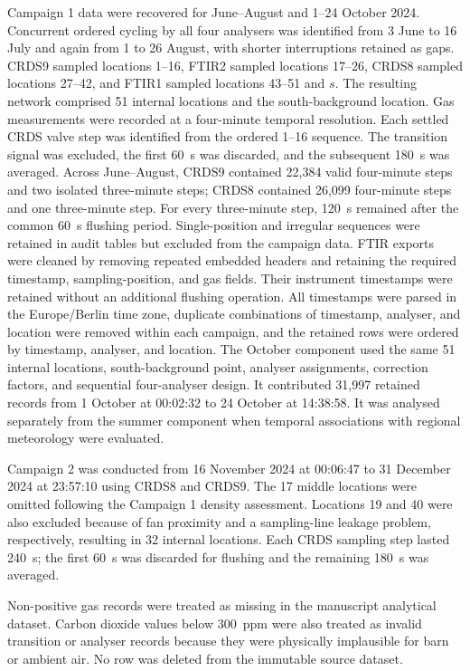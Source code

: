 \documentclass[12pt,a4paper]{article}
\begin{document}
Campaign 1 data were recovered for June--August and 1--24 October 2024.
Concurrent ordered
cycling by all four analysers was identified from 3 June to 16 July and again
from 1 to 26 August, with shorter interruptions retained as gaps. CRDS9
sampled locations 1--16, FTIR2 sampled locations 17--26,
CRDS8 sampled locations 27--42, and FTIR1 sampled locations 43--51 and \(s\).
The resulting network comprised 51 internal locations and the
south-background location. Gas measurements were recorded at a four-minute
temporal resolution. Each settled CRDS valve step was identified from the
ordered 1--16 sequence. The transition signal was excluded, the first
\SI{60}{s} was discarded, and the subsequent \SI{180}{s} was averaged.
Across June--August, CRDS9 contained 22,384 valid four-minute steps and two
isolated three-minute steps; CRDS8 contained 26,099 four-minute steps and one
three-minute step. For every three-minute step, \SI{120}{s} remained after
the common \SI{60}{s} flushing period. Single-position and irregular
sequences were retained in audit tables but excluded from the campaign data.
FTIR exports were cleaned by removing repeated embedded headers and retaining
the required timestamp, sampling-position, and gas fields. Their instrument
timestamps were retained without an additional flushing operation. All
timestamps were parsed in the Europe/Berlin time zone, duplicate combinations
of timestamp, analyser, and location were removed within each campaign, and
the retained rows were ordered by timestamp, analyser, and location.
The October component used the same 51 internal locations, south-background
point, analyser assignments, correction factors, and sequential four-analyser
design. It contributed 31,997 retained records from 1 October at 00:02:32 to
24 October at 14:38:58. It was analysed separately from the summer component
when temporal associations with regional meteorology were evaluated.

Campaign 2 was conducted from 16 November 2024 at 00:06:47 to 31 December
2024 at 23:57:10 using CRDS8 and CRDS9. The 17 middle locations were omitted
following the Campaign 1 density assessment. Locations 19 and 40 were also
excluded because of fan proximity and a sampling-line leakage problem,
respectively, resulting in 32 internal locations. Each CRDS sampling step
lasted \SI{240}{s}; the first \SI{60}{s} was discarded for flushing and the
remaining \SI{180}{s} was averaged.

Non-positive gas records were treated as missing in the manuscript analytical
dataset. Carbon dioxide values below \SI{300}{ppm} were also treated as
invalid transition or analyser records because they were physically
implausible for barn or ambient air. No row was deleted from the immutable
source dataset.
\end{document}
